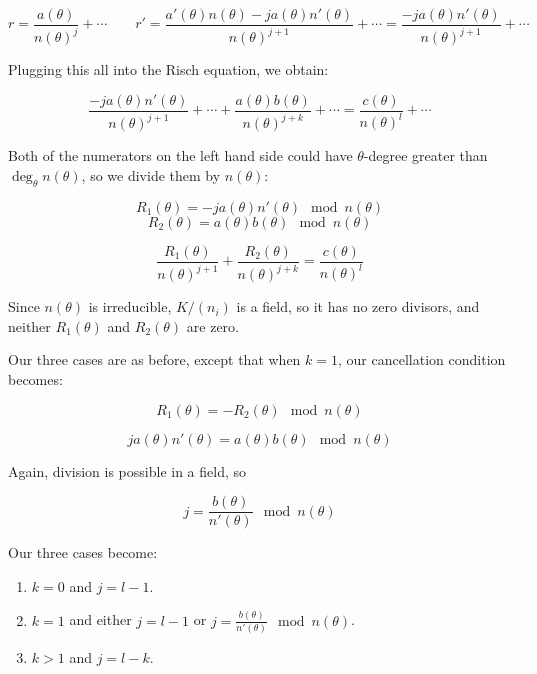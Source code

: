 $$r = \frac{a(\theta)}{n(\theta)^j} + \cdots  \qquad
r' = \frac{a'(\theta)n(\theta)-ja(\theta)n'(\theta)}{n(\theta)^{j+1}} + \cdots = \frac{-ja(\theta)n'(\theta)}{n(\theta)^{j+1}} + \cdots$$

Plugging this all into the Risch equation, we obtain:

$$\frac{-ja(\theta)n'(\theta)}{n(\theta)^{j+1}} + \cdots + \frac{a(\theta) b(\theta)}{n(\theta)^{j+k}} + \cdots = \frac{c(\theta)}{n(\theta)^l} + \cdots$$

Both of the numerators on the left hand side could have $\theta$-degree greater than $\deg_\theta n(\theta)$,
so we divide them by $n(\theta)$:



$$R_1(\theta) = -ja(\theta)n'(\theta) \mod n(\theta)$$
$$R_2(\theta) = a(\theta)b(\theta) \mod n(\theta)$$



$$\frac{R_1(\theta)}{n(\theta)^{j+1}} + \frac{R_2(\theta)}{n(\theta)^{j+k}} = \frac{c(\theta)}{n(\theta)^l}$$


Since $n(\theta)$ is irreducible, $K/(n_i)$ is a field, so it has no zero divisors, and
neither $R_1(\theta)$ and $R_2(\theta)$ are zero.

Our three cases are as before, except that when $k=1$, our cancellation condition becomes:

$$R_1(\theta) = -R_2(\theta) \mod n(\theta)$$

$$ja(\theta)n'(\theta) = a(\theta)b(\theta) \mod n(\theta)$$

Again, division is possible in a field, so

$$j = \frac{b(\theta)}{n'(\theta)} \mod n(\theta)$$

Our three cases become:

\begin{enumerate}

\item $k=0$ and $j = l-1$.

\item $k=1$ and either $j=l-1$ or $j = \frac{b(\theta)}{n'(\theta)} \mod n(\theta)$.

\item $k>1$ and $j=l-k$.

\end{enumerate}

